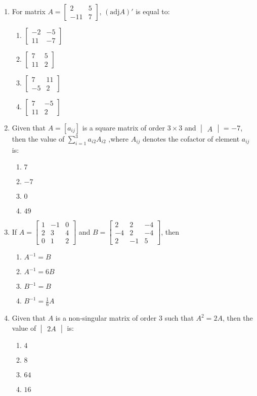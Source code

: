 \documentclass{article}
\newcommand{\myvec}[1]{\begin{bmatrix}#1\end{bmatrix}}
\newcommand{\mydet}[1]{\begin{vmatrix}#1\end{vmatrix}}
\begin{document}
\begin{enumerate}
    \item For matrix $A =\myvec{2&5 \\-11&7}$,
    $(\text{adj}A)'$ is equal to:
    \begin{enumerate}
        \item $\myvec{-2&-5\\11&-7}$
        \item $\myvec{7&5\\ 11&2}$
        \item $\myvec{7 &11\\-5&2}$
        \item $\myvec{7 & -5 \\11 & 2}$
    \end{enumerate}

    \item Given that $A = [a_{ij}]$ is a square matrix of order $3 \times 3$ and $\mydet{A}$ = $-7$, then the value of  $\sum_{i=1}^{3} a_{i2}A_{i2}$ ,where $A_{ij}$ denotes the cofactor of element $a_{ij}$ is:
    \begin{enumerate}
        \item $7$
        \item $-7$
        \item $0$
        \item $49$
    \end{enumerate}
    
    \item If $A =\myvec{1 &-1 & 0 \\2&3 & 4 \\0&1&2}$ and $B = \myvec{2&2&-4\\-4&2&-4\\2&-1&5}$, then
    \begin{enumerate}
        \item $A^{-1} = B$
        \item $A^{-1} = 6B$
        \item $B^{-1} = B$
        \item $B^{-1} = \frac{1}{6} A$
    \end{enumerate}
    \item Given that $A$ is a non-singular matrix of order $3$ such that $A^2 = 2A$, then the value of $\mydet{2A}$ is:\\
    \begin{enumerate}
        \item $4$
        \item $8$
        \item $64$
        \item $16$
    \end{enumerate}
    

\end{enumerate}
\end{document}
